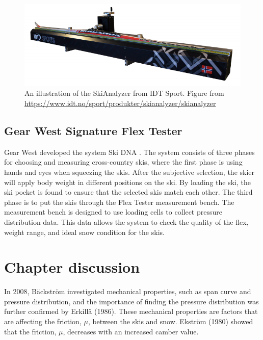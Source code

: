 \begin{figure}
    \centering
    \includegraphics[width=1\textwidth]{figures/skianalyzer.png}
    \caption{An illustration of the SkiAnalyzer from IDT Sport. Figure from \url{https://www.idt.no/sport/produkter/skianalyzer/skianalyzer}}
    \label{fig:skianalyzer}
\end{figure}

\subsection{Gear West Signature Flex Tester}
\label{subsec:gwsft}
Gear West developed the system Ski DNA \citep{skidna_2018}. The system consists of three phases for choosing and measuring cross-country skis, where the first phase is using hands and eyes when squeezing the skis. After the subjective selection, the skier will apply body weight in different positions on the ski. By loading the ski, the ski pocket is found to ensure that the selected skis match each other. The third phase is to put the skis through the Flex Tester measurement bench. The measurement bench is designed to use loading cells to collect pressure distribution data. This data allows the system to check the quality of the flex, weight range, and ideal snow condition for the skis.

\section{Chapter discussion}
In 2008, Bäckström investigated mechanical properties, such as span curve and pressure distribution, and the importance of finding the pressure distribution was further confirmed by Erkillä (1986). These mechanical properties are factors that are affecting the friction, $\mu$, between the skis and snow. Ekström (1980) showed that the friction, $\mu$, decreases with an increased camber value.


